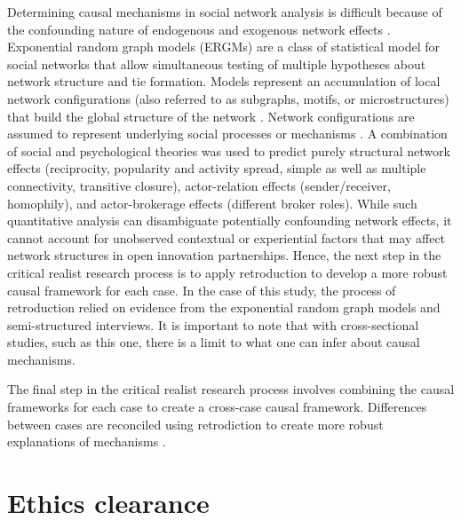 Determining causal mechanisms in social network analysis is difficult because of the confounding nature of endogenous and exogenous network effects \citep{rogowski2012estimating,forastiere2018estimating}. Exponential random graph models (ERGMs) are a class of statistical model for social networks that allow simultaneous testing of multiple hypotheses about network structure and tie formation. Models represent an accumulation of local network configurations (also referred to as subgraphs, motifs, or microstructures) that build the global structure of the network \citep{robins2013tutorial}. Network configurations are assumed to represent underlying social processes or mechanisms \citep{lusher2013exponential}. A combination of social and psychological theories was used to predict purely structural network effects (reciprocity, popularity and activity spread, simple as well as multiple connectivity, transitive closure), actor-relation effects (sender/receiver, homophily), and actor-brokerage effects (different broker roles). While such quantitative analysis can disambiguate potentially confounding network effects, it cannot account for unobserved contextual or experiential factors that may affect network structures in open innovation partnerships. Hence, the next step in the critical realist research process is to apply retroduction to develop a more robust causal framework for each case. In the case of this study, the process of retroduction relied on evidence from the exponential random graph models and semi-structured interviews. It is important to note that with cross-sectional studies, such as this one, there is a limit to what one can infer about causal mechanisms. \medskip

The final step in the critical realist research process involves combining the causal frameworks for each case to create a cross\hyp{}case causal framework. Differences between cases are reconciled using retrodiction to create more robust explanations of mechanisms \citep{mcavoy2018critical}. \medskip

\section{Ethics clearance}

